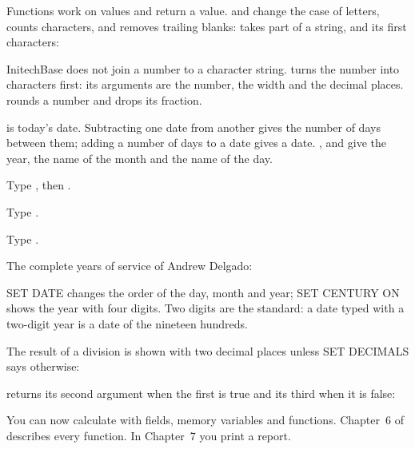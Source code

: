 Functions work on values and return a value.   and 
change the case of letters,  counts characters, and 
removes trailing blanks:
 takes part of a string, and  its first characters:

InitechBase does not join a number to a character string.   turns the
number into characters first: its arguments are the number, the width and the
decimal places.   rounds a number and  drops its fraction.

 is today's date.  Subtracting one date from another gives the
number of days between them; adding a number of days to a date gives a date.
,  and  give the year, the name of the month
and the name of the day.
\begin{Steps}[resume]
\item Type , then .
\item Type .
\item Type .
\end{Steps}
The complete years of service of Andrew Delgado:

SET DATE changes the order of the day, month and year; SET CENTURY ON shows the
year with four digits.
Two digits are the standard: a date typed with a two-digit year is a date of
the nineteen hundreds.

The result of a division is shown with two decimal places unless SET DECIMALS
says otherwise:

 returns its second argument when the first is true and its third
when it is false:

You can now calculate with fields, memory variables and functions.  Chapter~6
of  describes every function.  In Chapter~7 you
print a report.

